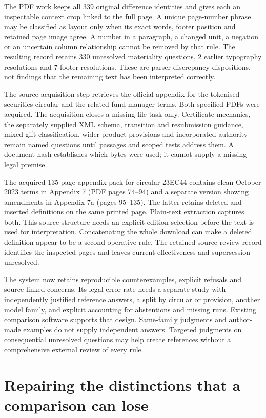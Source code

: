 \documentclass[12pt,a4paper,oneside,openany]{book}
\begin{document}
The PDF work keeps all 339 original difference identities and gives each an
inspectable context crop linked to the full page. A unique page-number phrase
may be classified as layout only when its exact words, footer position and
retained page image agree. A number in a paragraph, a changed unit, a negation or
an uncertain column relationship cannot be removed by that rule. The resulting record retains 330 unresolved materiality questions, 2 earlier typography resolutions and 7 footer resolutions.
These are parser-discrepancy dispositions, not findings that the remaining text
has been interpreted correctly.

The source-acquisition step retrieves the official appendix for the tokenised
securities circular and the related fund-manager terms. Both specified PDFs were acquired.
The acquisition closes a missing-file task only. Certificate mechanics, the
separately supplied XML schema, transition and resubmission guidance, mixed-gift
classification, wider product provisions and incorporated authority remain
named questions until passages and scoped tests address them. A document hash
establishes which bytes were used; it cannot supply a missing legal premise.

The acquired 135-page appendix pack for circular 23EC44 contains clean October
2023 terms in Appendix 7 (PDF pages 74--94) and a separate version showing
amendments in Appendix 7a (pages 95--135). The latter retains deleted and inserted definitions on the same
printed page. Plain-text extraction captures both. This source structure needs
an explicit edition selection before the text is used for interpretation.
Concatenating the whole download can make a deleted definition appear to be a
second operative rule. The retained source-review record identifies the inspected
pages and leaves current effectiveness and supersession unresolved.

The system now retains reproducible counterexamples, explicit refusals and
source-linked concerns. Its legal error rate needs a separate study with
independently justified reference answers, a split by circular or provision,
another model family, and explicit accounting for abstentions and missing runs.
Existing comparison software supports that design. Same-family judgments and
author-made examples do not supply independent answers. Targeted judgments on
consequential unresolved questions may help create references without a
comprehensive external review of every rule.

\section{Repairing the distinctions that a comparison can lose}
\label{sec:input-meaning-repair}
\end{document}
